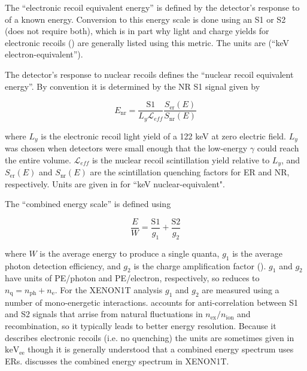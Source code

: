 The ``electronic recoil equivalent energy'' is defined by the detector's response to \gammarays of a known energy.  Conversion to this
energy
scale is done using an S1 or S2 (does not require both), which is in
part why light and charge yields for electronic recoils () are generally listed using this
metric.  The units are \kevee (``keV electron-equivalent'').

The detector's response to nuclear recoils defines the ``nuclear recoil equivalent energy''.  By convention it is determined by the NR S1
signal given by

\begin{equation}
E_{\mathrm{nr}} = \frac{\mathrm{S1}}{L_{y} \mathcal{L}_{eff}} \frac{S_{\mathrm{er}}(E)}{S_{\mathrm{nr}}(E)}
\label{eq:tpcs_signals_energy_energy_nr}
\end{equation}

\noindent where $L_{y}$ is the electronic recoil light yield of a 122 keV \gammaray at zero electric
field.  $L_{y}$ was chosen when detectors were small enough that the low-energy  $\gamma$ could reach the
entire volume.  $\mathcal{L}_{eff}$ is the nuclear recoil
scintillation yield relative to $L_{y}$, and $S_{\mathrm{er}}(E)$ and $S_{\mathrm{nr}}(E)$ are the scintillation quenching factors for ER
and NR, respectively.  Units are given in \kevnr for ``keV nuclear-equivalent".

The ``combined energy scale'' is defined using

\begin{equation}
\frac{E}{W} = \frac{\mathrm{S1}}{g_1} + \frac{\mathrm{S2}}{g_2}
\label{eq:tpcs_signals_energy_ces}
\end{equation}

\noindent where $W$ is the average energy to produce a single quanta, $g_1$ is the average photon detection efficiency, and $g_2$ is the
charge amplification factor ().  $g_1$ and $g_2$ have units of
PE/photon and PE/electron, respectively, so  reduces to
$n_{\mathrm{q}} = n_{\mathrm{ph}} + n_{\mathrm{e}}$.  For the XENON1T analysis $g_1$ and $g_2$ are measured using a
number of mono-energetic interactions.   accounts for
anti-correlation between S1 and S2 signals that arrise from natural fluctuations in $n_{\mathrm{ex}}/n_{\mathrm{ion}}$ and recombination,
so it typically leads to better energy resolution.  Because it describes electronic recoils (i.e. no quenching) the units are
sometimes given in $\mathrm{keV_{ee}}$ though it is generally understood that a combined energy spectrum uses
ERs.   discusses the combined energy spectrum in XENON1T.






















